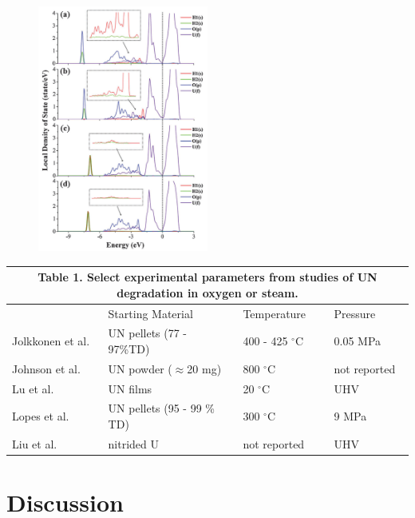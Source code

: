 \documentclass[11pt]{article}
\begin{document}
\begin{multicols}{2}
\begin{figure}[h]
	\begin{center}
		\includegraphics[width=0.5\textwidth]{Bo.png}
	\end{center}
\end{figure}
\begin{table}[!t]
	
	\setlength{\extrarowheight}{1.5mm}
	\begin{tabular}{ p{3.5cm} p{5cm} p{2.5cm} p{2.5cm}  }
		
		\multicolumn{4}{c}{\textbf{Table 1.} Select experimental parameters from studies of UN degradation in oxygen or steam.} \\
		\hline
		& Starting Material &Temperature & Pressure\\
		\hline
		Jolkkonen et al. \cite{Jolkkonen2017}   &  UN pellets (77 - 97\%TD) &400 - 425 $^{\circ}$C&  0.05 MPa \\
		Johnson et al. \cite{Johnson2016}   & UN powder ($\approx$20 mg)     &800 $^{\circ}$C&  not reported \\
		Lu et al. \cite{Lu2016}  & UN films    &20 $^{\circ}$C&   UHV \\
		Lopes et al. \cite{Lopes2017}   & UN pellets (95 - 99 \% TD)    & 300 $^{\circ}$C&   9 MPa \\
		Liu et al. & nitrided U & not reported  & UHV\\
		\hline
	\end{tabular}
\end{table}
\section{Discussion}


\end{multicols}
\end{document}
